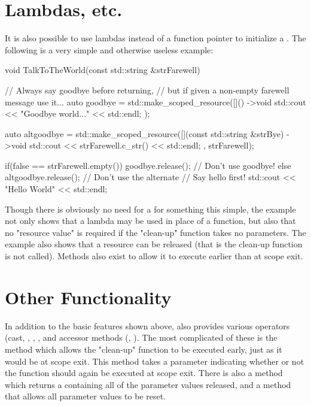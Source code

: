 \documentclass[ebook,11pt,article]{memoir}
\begin{document}
\section{Lambdas, etc.}
It is also possible to use lambdas instead of a function pointer to initialize a .  The following is a very simple and otherwise useless example:

\begin{codeblock}
void TalkToTheWorld(const std::string &strFarewell)
{
	// Always say goodbye before returning, 
	// but if given a non-empty farewell message use it...
	auto goodbye = std::make_scoped_resource([]() ->void
	{
		std::cout << "Goodbye world..." << std::endl;
	});
	
	auto altgoodbye = std::make_scoped_resource([](const std::string &strBye) ->void
	{
		std::cout << strFarewell.c_str() << std::endl;
	},
	strFarewell);

	if(false == strFarewell.empty())
	{
		goodbye.release();		// Don't use goodbye!
	}
	else
	{
		altgoodbye.release();	// Don't use the alternate
	}
	// Say hello first!
	std::cout << "Hello World" << std::endl;
}
\end{codeblock}
Though there is obviously no need for a  for something this simple, the example not only shows that a lambda may be used in place of a function, but also that no "resource value" is required if the "clean-up" function takes no parameters.  The example also shows that a resource can be released (that is the clean-up function is not called).  Methods also exist to allow it to execute earlier than at scope exit.

\section{Other Functionality}
In addition to the basic features shown above,  also provides various operators (cast, \tcode{->}, \tcode{()}, \tcode{*}, and accessor methods (, ).  The most complicated of these is the  method which allows the "clean-up" function to be executed early, just as it would be at scope exit.  This method takes a parameter indicating whether or not the function should again be executed at scope exit.  There is also a  method which returns a  containing all of the parameter values released, and a  method that allows all parameter values to be reset.
\end{document}

